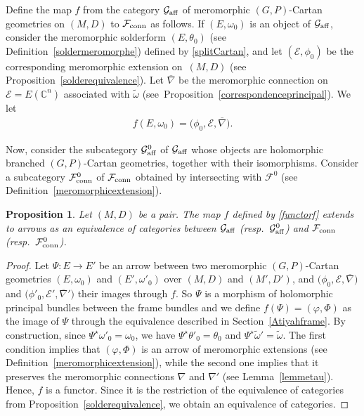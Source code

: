 \documentclass[pdftex]{sigma}
\numberwithin{equation}{section}
\newtheorem{Proposition}[Theorem]{Proposition}
 { \theoremstyle{definition}
\newtheorem{Definition}[Theorem]{Definition}
\newtheorem{Note}[Theorem]{Note}
\newtheorem{Exemple}[Theorem]{Example}
\newtheorem{Remark}[Theorem]{Remark} }
\begin{document}
Define the map $f$ from the category $\mathcal{G}_{\rm aff}$ of meromorphic $(G,P)$-Cartan geometries on $(M,D)$ to $\mathcal{F}_{\rm conn}$ as follows. If $(E,\omega_0)$ is an object of $\mathcal{G}_{\rm aff}$, consider the meromorphic solderform $(E,\theta_0)$ (see Definition~\ref{soldermeromorphe}) defined by \eqref{splitCartan}, and let $(\mathcal{E},\phi_0)$ be the corresponding meromorphic extension on~$(M,D)$ (see Proposition~\ref{solderequivalence}). Let $\overline{\nabla}$ be the meromorphic connection on $\mathcal{E}=E(\mathbb{C}^n)$ associated with $\tilde{\omega}$ (see~Proposition~\ref{correspondenceprincipal}). We let
 \begin{gather}\label{functorf} f(E,\omega_0)=\big(\phi_0,\mathcal{E},\overline{\nabla}\big).\end{gather}

Now, consider the subcategory $\mathcal{G}_{\rm aff}^0$ of $\mathcal{G}_{\rm aff}$ whose objects are holomorphic branched $(G,P)$-Cartan geometries, together with their isomorphisms. Consider a subcategory $\mathcal{F}_{\rm conn}^0$ of $\mathcal{F}_{\rm conn}$ obtained by intersecting with $\mathcal{F}^0$ (see Definition~\ref{meromorphicextension}).

\begin{Proposition}\label{equivalenceaffineextension} Let $(M,D)$ be a pair. The map $f$ defined by \eqref{functorf} extends to arrows as an equivalence of categories between $\mathcal{G}_{\rm aff}$ \big(resp.\ $\mathcal{G}_{\rm aff}^0$\big) and $\mathcal{F}_{\rm conn}$ \big(resp.\ $\mathcal{F}_{\rm conn}^0$\big).\end{Proposition}
\begin{proof} Let $\Psi\colon E \longrightarrow E'$ be an arrow between two meromorphic $(G,P)$-Cartan geometries $(E,\omega_0)$ and $(E',\omega'_0)$ over $(M,D)$ and $(M',D')$, and $\big(\phi_0,\mathcal{E},\overline{\nabla}\big)$ and $\big(\phi'_0,\mathcal{E}',\overline{\nabla}'\big)$ their images through $f$. So $\Psi$ is a morphism of holomorphic principal bundles between the frame bundles and we define $f(\Psi)=(\varphi,\Phi)$ as the image of $\Psi$ through the equivalence described in Section~\ref{Atiyahframe}. By construction, since $\Psi^\star \omega'_0= \omega_0$, we have $\Psi^\star \theta'_0 = \theta_0$ and $\Psi^\star \tilde{\omega}'=\tilde{\omega}$. The first condition implies that $(\varphi,\Phi)$ is an arrow of meromorphic extensions (see Definition~\ref{meromorphicextension}), while the second one implies that it preserves the meromorphic connections $\nabla$ and $\nabla'$ (see Lemma~\ref{lemmetau}). Hence, $f$ is a functor. Since it is the restriction of the equivalence of categories from Proposition~\ref{solderequivalence}, we obtain an equivalence of categories.
\end{proof}
\end{document}
